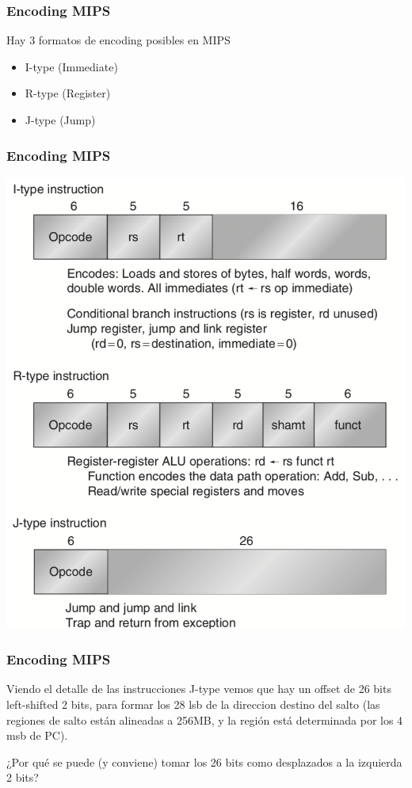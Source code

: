 \documentclass{beamer}
\begin{document}
\begin{frame}
 \frametitle{Encoding MIPS} 
 Hay 3 formatos de encoding posibles en MIPS
 \begin{itemize}
  \item I-type (Immediate)
  \item R-type (Register)
  \item J-type (Jump)
 \end{itemize}
\end{frame}

\begin{frame}
 \frametitle{Encoding MIPS} 
 
 \begin{center}
 \includegraphics[scale=.4,keepaspectratio=true]{tipos_instruccion.png}
\end{center}
 \end{frame}


\begin{frame}
 \frametitle{Encoding MIPS} 

 Viendo el detalle de las instrucciones J-type vemos que hay un offset de 26 bits left-shifted 2 bits, para formar los 28 lsb de la direccion destino del salto (las regiones de salto están alineadas a 256MB, y la región está determinada por los 4 msb de PC).
 
 \bigskip

 ¿Por qué se puede (y conviene) tomar los 26 bits como desplazados a la izquierda 2 bits?
\end{frame}
\end{document}
